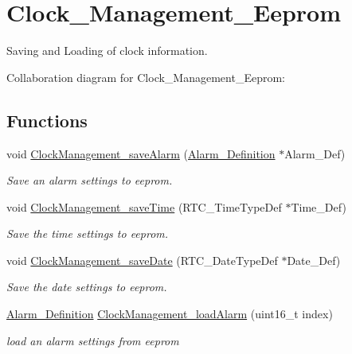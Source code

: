 \hypertarget{group___clock___management___eeprom}{}\section{Clock\+\_\+\+Management\+\_\+\+Eeprom}
\label{group___clock___management___eeprom}


Saving and Loading of clock information.  


Collaboration diagram for Clock\+\_\+\+Management\+\_\+\+Eeprom\+:
\subsection*{Functions}
\begin{DoxyCompactItemize}
\item 
void \hyperlink{group___clock___management___eeprom_ga693a2219ceebdab80e91367b040c751c}{Clock\+Management\+\_\+save\+Alarm} (\hyperlink{struct_alarm___definition}{Alarm\+\_\+\+Definition} $\ast$Alarm\+\_\+\+Def)
\begin{DoxyCompactList}\small\item\em Save an alarm settings to eeprom. \end{DoxyCompactList}\item 
void \hyperlink{group___clock___management___eeprom_ga009f76700625563bf41ca2c7beceff72}{Clock\+Management\+\_\+save\+Time} (R\+T\+C\+\_\+\+Time\+Type\+Def $\ast$Time\+\_\+\+Def)
\begin{DoxyCompactList}\small\item\em Save the time settings to eeprom. \end{DoxyCompactList}\item 
void \hyperlink{group___clock___management___eeprom_gaeb0fe7501d61ae2b3c76bff6813b3f92}{Clock\+Management\+\_\+save\+Date} (R\+T\+C\+\_\+\+Date\+Type\+Def $\ast$Date\+\_\+\+Def)
\begin{DoxyCompactList}\small\item\em Save the date settings to eeprom. \end{DoxyCompactList}\item 
\hyperlink{struct_alarm___definition}{Alarm\+\_\+\+Definition} \hyperlink{group___clock___management___eeprom_gab8401f24d519d3a2e54c3ba5dab80376}{Clock\+Management\+\_\+load\+Alarm} (uint16\+\_\+t index)
\begin{DoxyCompactList}\small\item\em load an alarm settings from eeprom \end{DoxyCompactList}\item 

\end{DoxyCompactItemize}
